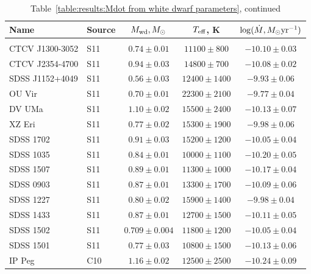 \begin{table}
    \centering
    \caption{Table~\ref{table:results:Mdot from white dwarf parameters}, continued}
    \label{table:results:Mdot from white dwarf parameters cont}
    \begin{tabular}{llccc}
        \hline
        \textbf{Name} & \textbf{Source} & \textbf{$M_{\rm wd}, M_\odot$} & \textbf{$T_{\rm eff}$, K} & \textbf{$\log (\dot M, M_\odot {\rm yr}^{-1})$} \\
        \hline \hline \\
        CTCV J1300-3052  &  S11  & $0.74 \pm 0.01$ & $11100\pm   800$ & $-10.10 \pm 0.03$ \\
        CTCV J2354-4700  &  S11  & $0.94 \pm 0.03$ & $14800\pm   700$ & $-10.08 \pm 0.02$ \\
        SDSS J1152+4049  &  S11  & $0.56 \pm 0.03$ & $12400\pm  1400$ & $ -9.93 \pm 0.06$ \\
        OU Vir           &  S11  & $0.70 \pm 0.01$ & $22300\pm  2100$ & $ -9.77 \pm 0.04$ \\
        DV UMa           &  S11  & $1.10 \pm 0.02$ & $15500\pm  2400$ & $-10.13 \pm 0.07$ \\
        XZ Eri           &  S11  & $0.77 \pm 0.02$ & $15300\pm  1900$ & $ -9.98 \pm 0.06$ \\
        SDSS 1702        &  S11  & $0.91 \pm 0.03$ & $15200\pm  1200$ & $-10.05 \pm 0.04$ \\
        SDSS 1035        &  S11  & $0.84 \pm 0.01$ & $10000\pm  1100$ & $-10.20 \pm 0.05$ \\
        SDSS 1507        &  S11  & $0.89 \pm 0.01$ & $11300\pm  1000$ & $-10.17 \pm 0.04$ \\
        SDSS 0903        &  S11  & $0.87 \pm 0.01$ & $13300\pm  1700$ & $-10.09 \pm 0.06$ \\
        SDSS 1227        &  S11  & $0.80 \pm 0.02$ & $15900\pm  1400$ & $ -9.98 \pm 0.04$ \\
        SDSS 1433        &  S11  & $0.87 \pm 0.01$ & $12700\pm  1500$ & $-10.11 \pm 0.05$ \\
        SDSS 1502        &  S11  & $0.709\pm0.004$ & $11800\pm  1200$ & $-10.05 \pm 0.04$ \\
        SDSS 1501        &  S11  & $0.77 \pm 0.03$ & $10800\pm  1500$ & $-10.13 \pm 0.06$ \\
        IP Peg           &  C10  & $1.16 \pm 0.02$ & $12500\pm  2500$ & $-10.24 \pm 0.09$ \\
        \hline
    \end{tabular}
\end{table}